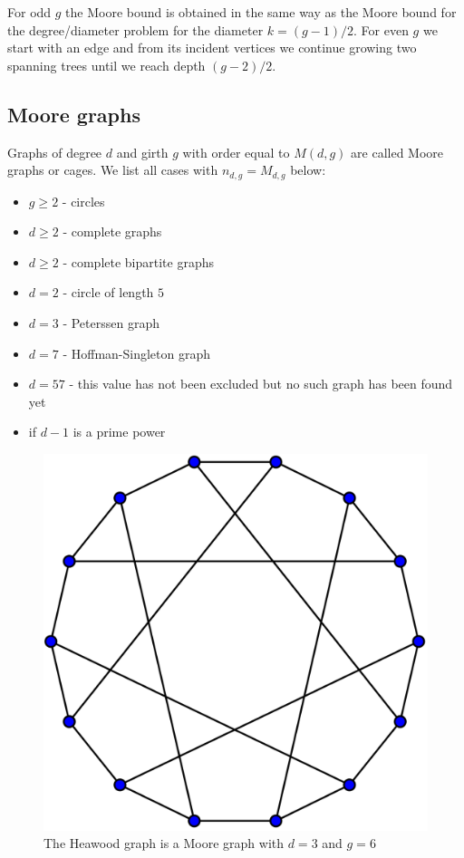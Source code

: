 \documentclass[a4paper,12pt,oneside]{report}%
\begin{document}
For odd $g$ the Moore bound is obtained in the same way as the Moore bound for the degree/diameter problem for the diameter $k=(g-1)/2$. For even $g$ we start with an edge and from its incident vertices we continue growing two spanning trees until we reach depth $(g-2)/2$.
\subsection{Moore graphs}
Graphs of degree $d$ and girth $g$ with order equal to $M(d,g)$ are called Moore graphs or cages. We list all cases with $n_{d,g} = M_{d,g}$ below:

\begin{itemize}
	\item{$g \geq 2$ - circles}
	\item{$d \geq 2$ - complete graphs}
	\item{$d \geq 2$ - complete bipartite graphs}
	\item{$d=2$ - circle of length $5$}
	\item[]{\makebox[2cm]{\hfill}$d=3$ - Peterssen graph}
	\item[]{\makebox[2cm]{\hfill}$d=7$ - Hoffman-Singleton graph}
	\item[]{\makebox[2cm]{\hfill}$d=57$ - this value has not been excluded but no such graph has been found yet }
	\item{if $d-1$ is a prime power}
\end{itemize}

\begin{figure}[!ht]
	\centering
	\includegraphics[scale=0.15]{Heawood_graph.png}
	\caption{The Heawood graph is a Moore graph with $d=3$ and $g=6$ }
\end{figure}
\end{document}
